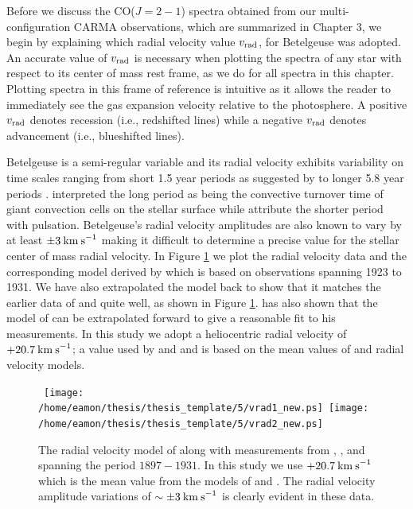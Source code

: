 Before we discuss the CO($J=2-1$) spectra obtained from our multi-configuration CARMA observations, which are summarized in Chapter 3, we begin by explaining which radial velocity value $v_{\rm{rad}}$, for Betelgeuse was adopted. An accurate value of $v_{\rm{rad}}$ is necessary when plotting the spectra of any star with respect to its center of mass rest frame, as we do for all spectra in this chapter. Plotting spectra in this frame of reference is intuitive as it allows the reader to immediately see the gas expansion velocity relative to the photosphere. A positive $v_{\rm{rad}}$ denotes recession (i.e., redshifted lines) while a negative $v_{\rm{rad}}$ denotes advancement (i.e., blueshifted lines).

Betelgeuse is a  semi-regular variable and its radial velocity exhibits variability on time scales ranging from short 1.5 year periods as suggested by \cite{stebbins_1931} to longer 5.8 year periods \citep{spencer_jones_1928,smith_1989}. 
\cite{stothers_1971} interpreted the long period as being the convective turnover time of giant convection cells on the stellar surface while \cite{dupree_1990} attribute the shorter period with pulsation. Betelgeuse's radial velocity amplitudes are also known to vary by at least $\pm 3\>{\rm km\>s}^{-1}$ \citep{smith_1989} making it difficult to determine a precise value for the stellar center of mass radial velocity. In Figure \ref{fig:5.3} we plot the radial velocity data and the corresponding model derived by \cite{sanford_1933} which is based on observations spanning 1923 to 1931. We have also extrapolated the model back to show that it matches the earlier data of \cite{bottlinger_1911} and \cite{spencer_jones_1928} quite well, as shown in Figure \ref{fig:5.3}. \cite{goldberg_1984} has also shown that the model of \cite{sanford_1933} can be extrapolated forward to give a reasonable fit to his measurements. In this study we adopt a heliocentric radial velocity of $+20.7\>{\rm km\>s}^{-1}$;  a value used by \cite{weymann_1962} and \citet{harper_2008} and is based on the mean values of \cite{spencer_jones_1928} and \cite{sanford_1933} radial velocity models. 

\begin{figure}[!t]
\centering 
\mbox{
          \texttt{[image: /home/eamon/thesis/thesis\_template/5/vrad1\_new.ps]}
          \texttt{[image: /home/eamon/thesis/thesis\_template/5/vrad2\_new.ps]}
          }
\caption[Radial velocity data and model for $\alpha$ Ori]{The radial velocity model of \cite{sanford_1933} along with measurements from \cite{bottlinger_1911}, \cite{spencer_jones_1928}, and \cite{sanford_1933} spanning the period $1897 - 1931$. In this study we use $+20.7\>{\rm km\>s}^{-1}$ which is the mean value from the models of \cite{spencer_jones_1928} and \cite{sanford_1933}. The radial velocity amplitude variations of $\sim \pm 3\>{\rm km\>s}^{-1}$ is clearly evident in these data.}
\label{fig:5.3}
\end{figure}

